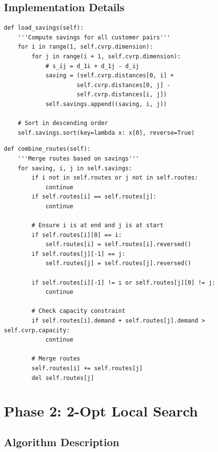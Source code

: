 \documentclass[12pt,a4paper]{article}
\theoremstyle{definition}
\begin{document}
\subsection{Implementation Details}

\begin{lstlisting}[caption={Clarke-Wright Savings Computation}]
def load_savings(self):
    '''Compute savings for all customer pairs'''
    for i in range(1, self.cvrp.dimension):
        for j in range(i + 1, self.cvrp.dimension):
            # s_ij = d_1i + d_1j - d_ij
            saving = (self.cvrp.distances[0, i] + 
                     self.cvrp.distances[0, j] - 
                     self.cvrp.distances[i, j])
            self.savings.append((saving, i, j))
    
    # Sort in descending order
    self.savings.sort(key=lambda x: x[0], reverse=True)
\end{lstlisting}

\begin{lstlisting}[caption={Route Merging with Capacity Constraint}]
def combine_routes(self):
    '''Merge routes based on savings'''
    for saving, i, j in self.savings:
        if i not in self.routes or j not in self.routes:
            continue
        if self.routes[i] == self.routes[j]:
            continue
        
        # Ensure i is at end and j is at start
        if self.routes[i][0] == i:
            self.routes[i] = self.routes[i].reversed()
        if self.routes[j][-1] == j:
            self.routes[j] = self.routes[j].reversed()
            
        if self.routes[i][-1] != i or self.routes[j][0] != j:
            continue
        
        # Check capacity constraint
        if self.routes[i].demand + self.routes[j].demand > self.cvrp.capacity:
            continue
        
        # Merge routes
        self.routes[i] += self.routes[j]
        del self.routes[j]
\end{lstlisting}

\section{Phase 2: 2-Opt Local Search}

\subsection{Algorithm Description}
\end{document}
